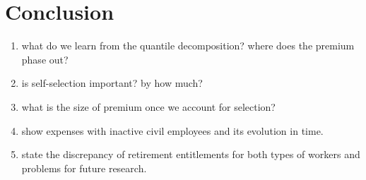 \documentclass{article}
\begin{document}
\section{Conclusion}
 \begin{enumerate}
     \item what do we learn from the quantile decomposition? where does the premium phase out?
     \item is self-selection important? by how much?
     \item what is the size of premium once we account for selection?
     \item show expenses with inactive civil employees and its evolution in time.
     \item state the discrepancy of retirement entitlements for both types of workers and problems for future research. 
\end{enumerate}  



\end{document}

